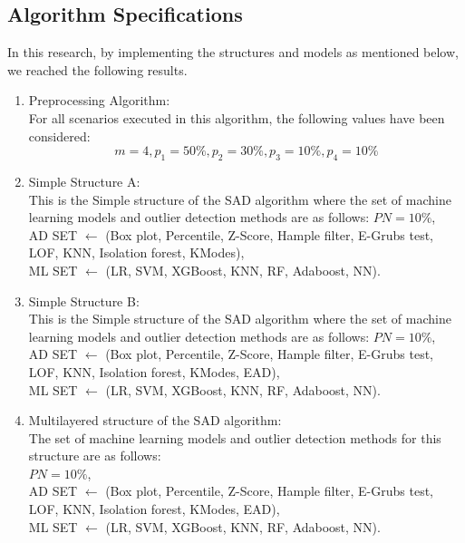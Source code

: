 \documentclass[12pt]{article}
\begin{document}
    \subsection*{Algorithm Specifications}
In this research, by implementing the structures and models as
mentioned below, we reached the following results.
    \begin{enumerate}
        \item Preprocessing Algorithm:\\
For all scenarios executed in this algorithm, the following values
have been considered: $$m = 4 , p_1 = 50\% , p_2 = 30\% , p_3 =
10\% , p_4 = 10\% $$

        \item Simple Structure A:\\
This is the  Simple structure of the SAD algorithm where the set of machine learning
models and outlier detection methods are as follows:
        $PN = 10\%$,
        \\ AD SET $\gets$ (Box plot, Percentile, Z-Score, Hample filter, E-Grubs test, LOF, KNN, Isolation forest, KModes),\\ ML SET $\gets$ (LR, SVM, XGBoost, KNN, RF, Adaboost, NN).

        \item Simple Structure B: \\
This is the Simple structure of the SAD algorithm where the set of machine learning
models and outlier detection methods are as follows: $PN =
10\%$,\\ AD SET $\gets$ (Box plot, Percentile, Z-Score, Hample
filter, E-Grubs test, LOF, KNN, Isolation forest, KModes, EAD),\\
ML SET $\gets$ (LR, SVM, XGBoost, KNN, RF, Adaboost, NN).

        \item Multilayered structure of the SAD algorithm:\\ The set of machine learning models and outlier detection methods for this structure are as follows:\\
        $PN = 10\%$,\\ AD SET $\gets$ (Box plot, Percentile, Z-Score, Hample filter, E-Grubs test, LOF, KNN, Isolation forest, KModes, EAD),\\ ML SET $\gets$ (LR, SVM, XGBoost, KNN, RF, Adaboost, NN).
    \end{enumerate}
\end{document}
